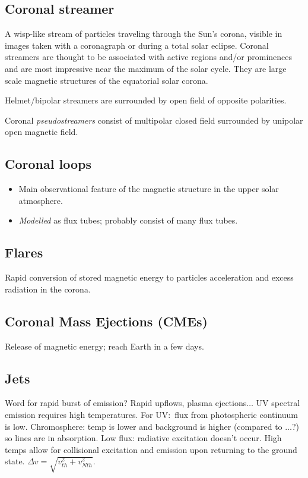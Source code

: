\documentclass{article}
\begin{document}
\subsection{Coronal streamer}
A wisp-like stream of particles traveling through the Sun's corona, visible in
images taken with a coronagraph or during a total solar eclipse. Coronal
streamers are thought to be associated with active regions and/or prominences
and are most impressive near the maximum of the solar cycle. They are large
scale magnetic structures of the equatorial solar corona.

Helmet/bipolar streamers are surrounded by open field of opposite polarities.

Coronal \textit{pseudostreamers} consist of multipolar closed field
surrounded by unipolar open magnetic field.

\subsection{Coronal loops}
\begin{itemize}
    \item Main observational feature of the magnetic structure in the
        upper solar atmosphere.
    \item \emph{Modelled} as flux tubes; probably consist of
        many flux tubes.
\end{itemize}

\subsection{Flares}
Rapid conversion of stored magnetic energy to particles acceleration and
excess radiation in the corona.

\subsection{Coronal Mass Ejections (CMEs)}
Release of magnetic energy; reach Earth in a few days.

\subsection{Jets}
Word for rapid burst of emission? Rapid upflows, plasma
ejections$\ldots$ UV spectral emission requires high temperatures.
For UV:\ flux from photospheric continuum is low. Chromosphere:
temp is lower and background is higher (compared to $\ldots$?)
so lines are in absorption. Low flux: radiative excitation doesn't occur.
High temps allow for collisional excitation and emission upon returning
to the ground state. $\Delta v = \sqrt{v_{th}^2+v_{Nth}^2}$.
\end{document}
